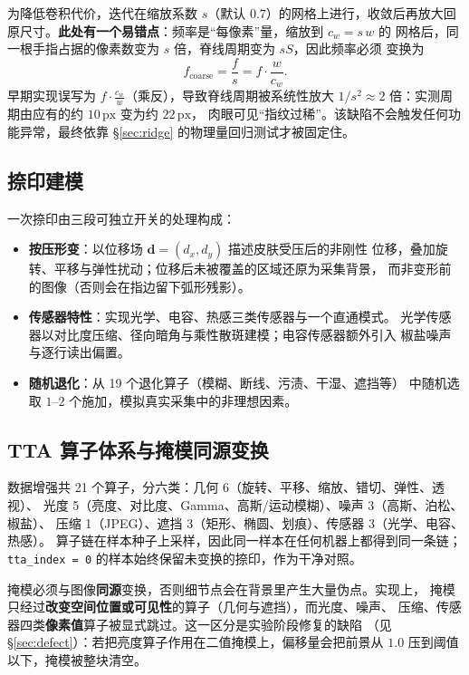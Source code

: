 \documentclass[UTF8, fontset=windows, a4paper, 11pt]{ctexart}
\newcommand{\px}{\,\mathrm{px}}
\begin{document}
为降低卷积代价，迭代在缩放系数 $s$（默认 $0.7$）的网格上进行，收敛后再放大回
原尺寸。\textbf{此处有一个易错点}：频率是``每像素''量，缩放到 $c_w = s\,w$ 的
网格后，同一根手指占据的像素数变为 $s$ 倍，脊线周期变为 $sS$，因此频率必须
变换为
\begin{equation}
f_{\text{coarse}} = \frac{f}{s} = f \cdot \frac{w}{c_w} .
\label{eq:scale}
\end{equation}
早期实现误写为 $f\cdot\frac{c_w}{w}$（乘反），导致脊线周期被系统性放大
$1/s^2 \approx 2$ 倍：实测周期由应有的约 $10\px$ 变为约 $22\px$，
肉眼可见``指纹过稀''。该缺陷不会触发任何功能异常，最终依靠
\S\ref{sec:ridge} 的物理量回归测试才被固定住。

\subsection{捺印建模}

一次捺印由三段可独立开关的处理构成：

\begin{itemize}
    \item \textbf{按压形变}：以位移场 $\bm{d}=(d_x,d_y)$ 描述皮肤受压后的非刚性
          位移，叠加旋转、平移与弹性扰动；位移后未被覆盖的区域还原为采集背景，
          而非变形前的图像（否则会在指边留下弧形残影）。
    \item \textbf{传感器特性}：实现光学、电容、热感三类传感器与一个直通模式。
          光学传感器以对比度压缩、径向暗角与乘性散斑建模；电容传感器额外引入
          椒盐噪声与逐行读出偏置。
    \item \textbf{随机退化}：从 19 个退化算子（模糊、断线、污渍、干湿、遮挡等）
          中随机选取 $1$--$2$ 个施加，模拟真实采集中的非理想因素。
\end{itemize}

\subsection{TTA 算子体系与掩模同源变换}

数据增强共 21 个算子，分六类：几何 6（旋转、平移、缩放、错切、弹性、透视）、
光度 5（亮度、对比度、Gamma、高斯/运动模糊）、噪声 3（高斯、泊松、椒盐）、
压缩 1（JPEG）、遮挡 3（矩形、椭圆、划痕）、传感器 3（光学、电容、热感）。
算子链在样本种子上采样，因此同一样本在任何机器上都得到同一条链；
\texttt{tta\_index = 0} 的样本始终保留未变换的捺印，作为干净对照。

掩模必须与图像\textbf{同源}变换，否则细节点会在背景里产生大量伪点。实现上，
掩模只经过\textbf{改变空间位置或可见性}的算子（几何与遮挡），而光度、噪声、
压缩、传感器四类\textbf{像素值}算子被显式跳过。这一区分是实验阶段修复的缺陷
（见 \S\ref{sec:defect}）：若把亮度算子作用在二值掩模上，偏移量会把前景从
$1.0$ 压到阈值以下，掩模被整块清空。
\end{document}
